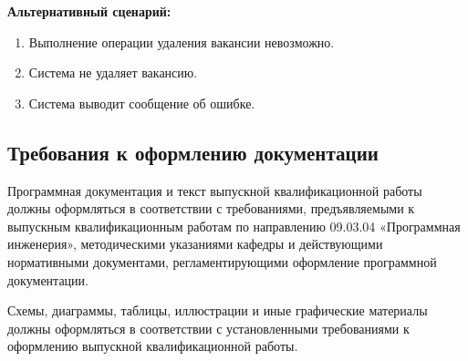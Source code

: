 \textbf{Альтернативный сценарий:}
\begin{enumerate}
	\item Выполнение операции удаления вакансии невозможно.
	\item Система не удаляет вакансию.
	\item Система выводит сообщение об ошибке.
\end{enumerate}

\subsection{Требования к оформлению документации}

Программная документация и текст выпускной квалификационной работы должны оформляться в соответствии с требованиями, предъявляемыми к выпускным квалификационным работам по направлению 09.03.04 «Программная инженерия», методическими указаниями кафедры и действующими нормативными документами, регламентирующими оформление программной документации.

Схемы, диаграммы, таблицы, иллюстрации и иные графические материалы должны оформляться в соответствии с установленными требованиями к оформлению выпускной квалификационной работы.